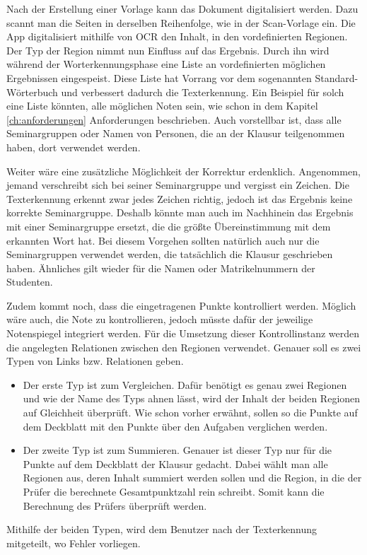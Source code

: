 \documentclass[nomenclature, oneside, 150]{HSMW-Thesis}
\begin{document}
	Nach der Erstellung einer Vorlage kann das Dokument digitalisiert werden. Dazu scannt man die Seiten in derselben Reihenfolge, wie in der Scan-Vorlage ein. Die App digitalisiert mithilfe von OCR den Inhalt, in den vordefinierten Regionen. Der Typ der Region nimmt nun Einfluss auf das Ergebnis. Durch ihn wird während der Worterkennungsphase eine Liste an vordefinierten möglichen Ergebnissen eingespeist. Diese Liste hat Vorrang vor dem sogenannten Standard-Wörterbuch und verbessert dadurch die Texterkennung. Ein Beispiel für solch eine Liste könnten, alle möglichen Noten sein, wie schon in dem Kapitel \ref{ch:anforderungen} Anforderungen beschrieben. Auch vorstellbar ist, dass alle Seminargruppen oder Namen von Personen, die an der Klausur teilgenommen haben, dort verwendet werden. 
	
	Weiter wäre eine zusätzliche Möglichkeit der Korrektur erdenklich. Angenommen, jemand verschreibt sich bei seiner Seminargruppe und vergisst ein Zeichen. Die Texterkennung erkennt zwar jedes Zeichen richtig, jedoch ist das Ergebnis keine korrekte Seminargruppe. Deshalb könnte man auch im Nachhinein das Ergebnis mit einer Seminargruppe ersetzt, die die größte Übereinstimmung mit dem erkannten Wort hat. Bei diesem Vorgehen sollten natürlich auch nur die Seminargruppen verwendet werden, die tatsächlich die Klausur geschrieben haben. Ähnliches gilt wieder für die Namen oder Matrikelnummern der Studenten.
	
	Zudem kommt noch, dass die eingetragenen Punkte kontrolliert werden. Möglich wäre auch, die Note zu kontrollieren, jedoch müsste dafür der jeweilige Notenspiegel integriert werden. Für die Umsetzung dieser Kontrollinstanz werden die angelegten Relationen zwischen den Regionen verwendet. Genauer soll es zwei Typen von Links bzw. Relationen geben.
		\begin{itemize}
			\item Der erste Typ ist zum Vergleichen. Dafür benötigt es genau zwei Regionen und wie der Name des Typs ahnen lässt, wird der Inhalt der beiden Regionen auf Gleichheit überprüft. Wie schon vorher erwähnt, sollen so die Punkte auf dem Deckblatt mit den Punkte über den Aufgaben verglichen werden.
			\item Der zweite Typ ist zum Summieren. Genauer ist dieser Typ nur für die Punkte auf dem Deckblatt der Klausur gedacht. Dabei wählt man alle Regionen aus, deren Inhalt summiert werden sollen und die Region, in die der Prüfer die berechnete Gesamtpunktzahl rein schreibt. Somit kann die Berechnung des Prüfers überprüft werden.
		\end{itemize} 
		Mithilfe der beiden Typen, wird dem Benutzer nach der Texterkennung mitgeteilt, wo Fehler vorliegen.
		
\end{document}
